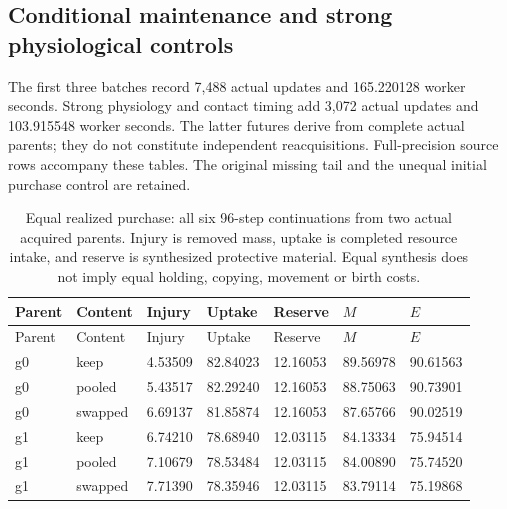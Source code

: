 \subsection*{Conditional maintenance and strong physiological controls}
The first three batches record 7,488 actual updates and 165.220128 worker seconds. Strong physiology and contact timing add 3,072 actual updates and 103.915548 worker seconds. The latter futures derive from complete actual parents; they do not constitute independent reacquisitions. Full-precision source rows accompany these tables. The original missing tail and the unequal initial purchase control are retained.
\begingroup\scriptsize\setlength{\tabcolsep}{3pt}\setlength{\LTpre}{6pt}\setlength{\LTpost}{6pt}
\begin{longtable}{lllllll}
\caption{Equal realized purchase: all six 96-step continuations from two actual acquired parents. Injury is removed mass, uptake is completed resource intake, and reserve is synthesized protective material. Equal synthesis does not imply equal holding, copying, movement or birth costs.}\label{tab:maintenance-equal}\\
\toprule
Parent & Content & Injury & Uptake & Reserve & $M$ & $E$ \\
\midrule
\endfirsthead
\toprule
Parent & Content & Injury & Uptake & Reserve & $M$ & $E$ \\
\midrule
\endhead
g0 & keep & 4.53509 & 82.84023 & 12.16053 & 89.56978 & 90.61563 \\
g0 & pooled & 5.43517 & 82.29240 & 12.16053 & 88.75063 & 90.73901 \\
g0 & swapped & 6.69137 & 81.85874 & 12.16053 & 87.65766 & 90.02519 \\
g1 & keep & 6.74210 & 78.68940 & 12.03115 & 84.13334 & 75.94514 \\
g1 & pooled & 7.10679 & 78.53484 & 12.03115 & 84.00890 & 75.74520 \\
g1 & swapped & 7.71390 & 78.35946 & 12.03115 & 83.79114 & 75.19868 \\
\bottomrule
\end{longtable}
